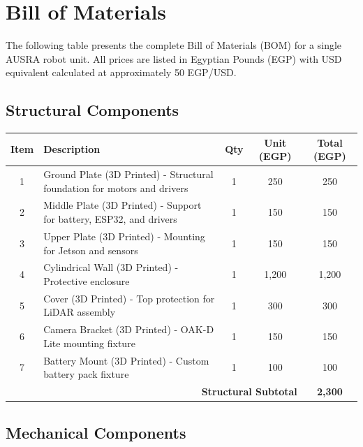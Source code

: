 \chapter{Bill of Materials}
\label{app:bom}

The following table presents the complete Bill of Materials (BOM) for a single AUSRA robot unit. All prices are listed in Egyptian Pounds (EGP) with USD equivalent calculated at approximately 50 EGP/USD.

\section{Structural Components}

\begin{longtable}{|c|p{4cm}|c|c|c|}
\hline
\textbf{Item} & \textbf{Description} & \textbf{Qty} & \textbf{Unit (EGP)} & \textbf{Total (EGP)} \\
\hline
\endhead
1 & Ground Plate (3D Printed) - Structural foundation for motors and drivers & 1 & 250 & 250 \\
2 & Middle Plate (3D Printed) - Support for battery, ESP32, and drivers & 1 & 150 & 150 \\
3 & Upper Plate (3D Printed) - Mounting for Jetson and sensors & 1 & 150 & 150 \\
4 & Cylindrical Wall (3D Printed) - Protective enclosure & 1 & 1,200 & 1,200 \\
5 & Cover (3D Printed) - Top protection for LiDAR assembly & 1 & 300 & 300 \\
6 & Camera Bracket (3D Printed) - OAK-D Lite mounting fixture & 1 & 150 & 150 \\
7 & Battery Mount (3D Printed) - Custom battery pack fixture & 1 & 100 & 100 \\
\hline
\multicolumn{4}{|r|}{\textbf{Structural Subtotal}} & \textbf{2,300} \\
\hline
\end{longtable}

\section{Mechanical Components}

